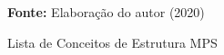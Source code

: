 \begin{figure}[ht!]
\centering

\caption{\textmd{Lista de Conceitos de Estrutura \gls{MPS}}}
\label{fig:structure}

\par\medskip\textbf{Fonte:} Elaboração do autor (2020) \par\medskip

\end{figure}

